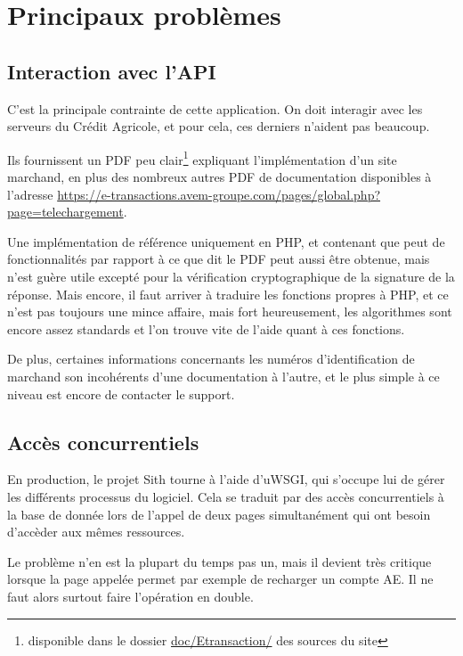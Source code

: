 \documentclass[a4paper]{report}
\begin{document}
\section{Principaux problèmes}
\label{sec:principaux_problemes}

\subsection{Interaction avec l'API}
\label{sub:interaction_avec_l_api}
\par C'est la principale contrainte de cette application. On doit interagir avec les serveurs du Crédit Agricole, et
pour cela, ces derniers n'aident pas beaucoup.

\par Ils fournissent un PDF peu clair\footnote{disponible dans le dossier \url{doc/Etransaction/} des sources du site}
expliquant l'implémentation d'un site marchand, en plus des nombreux autres PDF de documentation disponibles à l'adresse
\url{https://e-transactions.avem-groupe.com/pages/global.php?page=telechargement}.

\par Une implémentation de référence uniquement en PHP, et contenant que peut de fonctionnalités par rapport à ce
que dit le PDF peut aussi être obtenue, mais n'est guère utile excepté pour la vérification cryptographique de la
signature de la réponse. Mais encore, il faut arriver à traduire les fonctions propres à PHP, et ce n'est pas toujours
une mince affaire, mais fort heureusement, les algorithmes sont encore assez standards et l'on trouve vite de l'aide
quant à ces fonctions.

\par De plus, certaines informations concernants les numéros d'identification de marchand son incohérents
d'une documentation à l'autre, et le plus simple à ce niveau est encore de contacter le support.

\subsection{Accès concurrentiels}
\label{sub:acces_concurrentiels}
\par En production, le projet Sith tourne à l'aide d'uWSGI, qui s'occupe lui de gérer les différents processus du
logiciel. Cela se traduit par des accès concurrentiels à la base de donnée lors de l'appel de deux pages simultanément
qui ont besoin d'accèder aux mêmes ressources.

\par Le problème n'en est la plupart du temps pas un, mais il devient très critique lorsque la page appelée permet par
exemple de recharger un compte AE. Il ne faut alors surtout faire l'opération en double.
\end{document}
